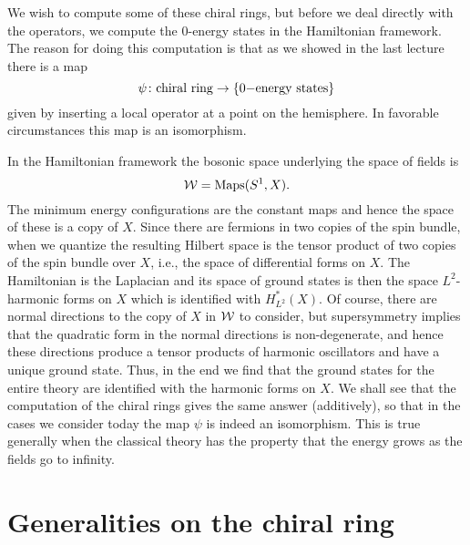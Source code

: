 We wish to compute some of these chiral rings, but before we deal
directly with the operators, we compute the $0$-energy states in
the Hamiltonian framework. The reason for doing this computation is
that as we showed in the last lecture there is a map
$$\psi\colon {\rm chiral\ ring}\to \{0{\rm -energy\ states}\}$$
given by inserting a local operator at a point on the hemisphere.
In favorable circumstances this  map is an isomorphism.


In the Hamiltonian framework the bosonic space underlying the space
of fields is
$${\cal W}={\rm Maps}(S^1,X).$$
The minimum energy configurations are the constant maps and hence the
space of these is a copy of $X$.
Since there are fermions in two copies of the
spin bundle, when we quantize  the resulting Hilbert space is the
tensor product of two copies of the spin bundle over $X$, i.e., the space of
differential forms on $X$. The Hamiltonian is the Laplacian and its
space of ground states is then the space
$L^2$-harmonic  forms on $X$ which is identified with $H^*_{L^2}(X)$.
Of course, there are normal directions to the copy of $X$ in ${\cal
W}$ to consider, but supersymmetry implies that the
quadratic form in the normal directions is non-degenerate, and hence
these directions produce a tensor products of harmonic oscillators and
have a unique ground state. Thus, in the end we find that the ground
states for the entire theory are identified with the harmonic forms on
$X$.
We shall see that the computation of the chiral rings gives the same
answer (additively), so that in the cases we consider today the map
$\psi$ is indeed an isomorphism.  This is true generally when the
classical theory has the property that the energy grows as the fields
go to infinity.


\section{Generalities on the chiral ring}

